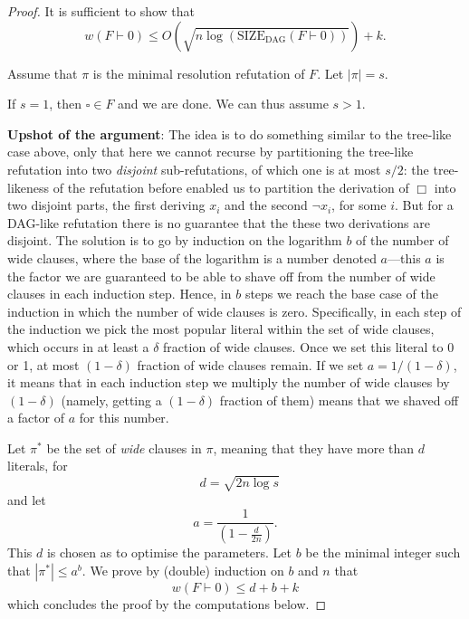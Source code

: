 \begin{proof}
It is sufficient to show that
\[
w(F \vdash 0) \leq O\left(\sqrt{n \log(\text{SIZE}_{\text{DAG}}(F \vdash 0))}\right) + k.
\]


 Assume that $\pi$ is the minimal resolution refutation of $F$. Let $|\pi| = s$.

If $s = 1$, then $\square \in F$ and we are  done. We can thus assume  $s > 1$.
\bigskip

\begin{tcolorbox}[colframe=white, colback=red!5, boxrule=0mm, sharp corners,breakable]
\noindent \textbf{Upshot of the argument}:
The idea is to do something similar to the tree-like case above, only that here we cannot recurse by partitioning the tree-like refutation into two \emph{disjoint} sub-refutations, of which one is at most $s/2$: the tree-likeness of the refutation before enabled us to partition the derivation of $\Box$ into two disjoint parts, the first deriving $x_i$ and the second $\neg x_i$, for some $i$. But for a DAG-like refutation there is no guarantee that the these two derivations are disjoint. The solution is to go by induction on the logarithm $b$ of the number of wide clauses, where the base of the logarithm is a number denoted $a$---this $a$ is the factor we are guaranteed to be able to shave off from the number of wide clauses in each induction step. Hence, in $b$ steps we reach the base case of the induction in which the number of wide clauses is zero. Specifically, in each step of the induction we pick the most popular literal within the set of wide clauses, which occurs in at least a $\delta$ fraction of wide clauses. Once we set this literal to 0 or 1, at most $(1-\delta)$ fraction of wide clauses remain. If we set $a=1/(1-\delta)$, it means that in each induction step we multiply the number of wide clauses by $(1-\delta)$ (namely, getting a $(1-\delta)$ fraction of them) means that we shaved off a factor of $a$ for this number. 
\end{tcolorbox}
\bigskip

Let $\pi^*$ be the set of \textit{wide} clauses in $\pi$, meaning that they have more than $d$ literals, for  
$$
    \text{ } d = \sqrt{2n \log s} 
$$
  and let 
    \[
    a = \frac{1}{\left(1 - \frac{d}{2n} \right)}.
    \]
This  $d$ is chosen as to optimise the parameters. Let $b$ be the minimal integer such that $|\pi^*| \leq a^b$.
We prove by (double) induction on $b$ and $n$ that  
    \[
    w(F \vdash 0) \leq d + b + k
    \]
    which concludes the proof by the computations below.


\end{proof}
